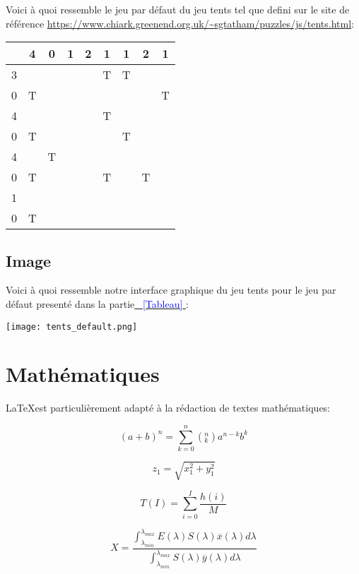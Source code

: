 \documentclass[12pt]{article}
\let\LaTeXStandardSubsection\subsection
\renewcommand{\subsection}[1]{\filbreak\LaTeXStandardSubsection{#1}}
\begin{document}
Voici à quoi ressemble le jeu par défaut du jeu tents tel que defini sur le site de référence \textcolor{blue}{\url{https://www.chiark.greenend.org.uk/~sgtatham/puzzles/js/tents.html}}:

\medskip

\begin{center}
\begin{tabular}{ c | c  c  c  c  c  c  c  c | }		
        & 4 & 0 & 1 & 2 & 1 & 1 & 2 & 1 \\
      \hline
     3 &   &   &   &   & T & T &   &   \\
     0 & T &   &   &   &   &   &   & T \\
     4 &   &   &   &   & T &   &   &   \\
     0 & T &   &   &   &   & T &   &   \\
     4 &   & T &   &   &   &   &   &   \\
     0 & T &   &   &   & T &   & T &   \\
     1 &   &   &   &   &   &   &   &   \\
     0 & T &   &   &   &   &   &   &   \\
    \hline  
    \end{tabular}
    
  \end{center}

\subsection{Image}

Voici à quoi ressemble notre interface graphique du jeu tents pour le jeu par défaut
presenté dans la partie\hyperref[Tableau]{ \textcolor{blue}{~\ref{Tableau}} }:

\medskip

\texttt{[image: tents\_default.png]}


\filbreak
\section{Mathématiques}

\LaTeX est particulièrement adapté à la rédaction de textes mathématiques: 


\[(a+b)^n = \sum_{k=0}^{n} (^n_k ) a^{n-k} b^k \]

\[ z_1 = \sqrt{x^2_1 + y^2_1} \]

\[ T(I) = \sum_{i=0}^{I} \frac{h(i)}{M} \]

\[ X = \frac{\int_{\lambda_{min}}^{\lambda_{max}} E(\lambda)S(\lambda)\overline{x}(\lambda)d\lambda}{\int_{\lambda_{min}}^{\lambda_{max}}S(\lambda)\overline{y}(\lambda)d\lambda} \]
\end{document}
